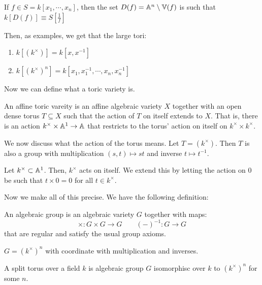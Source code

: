 \documentclass[12pt]{amsart}
\begin{document}
\begin{lemma}
    If $f \in S = k[x_1, \cdots, x_n]$, then the set $D(f) = \mathbb A^n \setminus \mathbb V(f)$ is such that $k[D(f)] \equiv S\left[\frac{1}{f}\right]$
\end{lemma}

Then, as examples, we get that the large tori:
\begin{enumerate}
    \item $k[(k^\times)] = k[x, x^{-1}]$
    \item $k[(k^\times)^n] = k[x_1, x_1^{-1}, \cdots, x_n, x_n^{-1}]$
\end{enumerate}

Now we can define what a toric variety is. 
\begin{definition}
    An affine toric vareity is an affine algebraic variety $X$ together with an open dense torus $T \subseteq X$ such that the action of $T$ on itself extends to $X$. That is, there is an action $k^\times \times \mathbb A^1 \to \mathbb A$ that restricts to the torus' action on itself on $k^\times \times k^\times$. 
\end{definition}

We now discuss what the action of the torus means. Let $T = (k^\times)$. Then $T$ is also a group with multiplication $(s,t) \mapsto st$ and inverse $t \mapsto t^{-1}$.

\begin{example}
    Let $k^\times \subset \mathbb A^1$. Then, $k^\times$ acts on itself. We extend this by letting the action on $0$ be such that $t \times 0 = 0$ for all $t \in k^\times$. 
\end{example}

Now we make all of this precise. We have the following definition:
\begin{definition}
    An algebraic group is an algebraic variety $G$ together with maps: 
    \[ \times: G \times G \to G \qquad (-)^{-1}: G \to G\]
    that are regular and satisfy the usual group axioms.
\end{definition}

\begin{example}
    $G = (k^\times)^n$ with coordinate with multiplication and inverses. 
\end{example}

\begin{definition}
    A split torus over a field $k$ is algebraic group $G$ isomorphisc over $k$ to $(k^\times)^n$ for some $n$. 
\end{definition}
\end{document}
